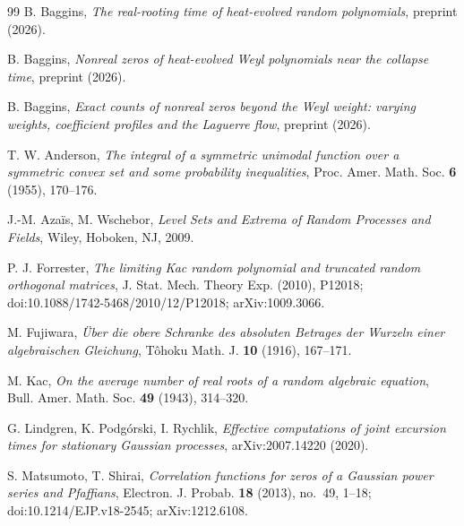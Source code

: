 \documentclass[11pt]{amsart}
\theoremstyle{definition}
\theoremstyle{remark}
\numberwithin{equation}{section}
\begin{document}
\begin{thebibliography}{99}
 B. Baggins, \emph{The real-rooting time of heat-evolved random polynomials}, preprint (2026).

 B. Baggins, \emph{Nonreal zeros of heat-evolved Weyl polynomials near the collapse time}, preprint (2026).

 B. Baggins, \emph{Exact counts of nonreal zeros beyond the Weyl weight: varying weights, coefficient profiles and the Laguerre flow}, preprint (2026).

 T. W. Anderson, \emph{The integral of a symmetric unimodal function over a symmetric convex set and some probability inequalities}, Proc. Amer. Math. Soc. \textbf{6} (1955), 170--176.

 J.-M. Aza\"is, M. Wschebor, \emph{Level Sets and Extrema of Random Processes and Fields}, Wiley, Hoboken, NJ, 2009.

 P. J. Forrester, \emph{The limiting Kac random polynomial and truncated random orthogonal matrices}, J. Stat. Mech. Theory Exp. (2010), P12018; doi:10.1088/1742-5468/2010/12/P12018; arXiv:1009.3066.

 M. Fujiwara, \emph{\"Uber die obere Schranke des absoluten Betrages der Wurzeln einer algebraischen Gleichung}, T\^ohoku Math. J. \textbf{10} (1916), 167--171.

 M. Kac, \emph{On the average number of real roots of a random algebraic equation}, Bull. Amer. Math. Soc. \textbf{49} (1943), 314--320.

 G. Lindgren, K. Podg\'orski, I. Rychlik, \emph{Effective computations of joint excursion times for stationary Gaussian processes}, arXiv:2007.14220 (2020).

 S. Matsumoto, T. Shirai, \emph{Correlation functions for zeros of a Gaussian power series and Pfaffians}, Electron. J. Probab. \textbf{18} (2013), no.~49, 1--18; doi:10.1214/EJP.v18-2545; arXiv:1212.6108.

\end{thebibliography}
\end{document}
